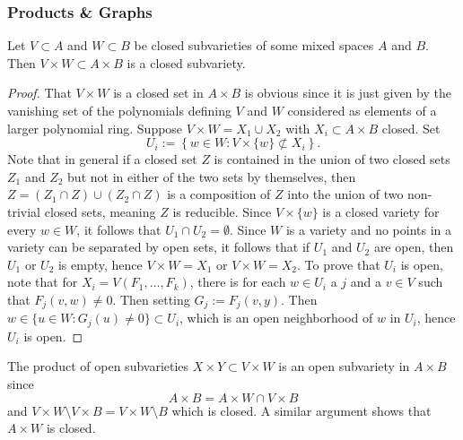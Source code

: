     \subsubsection{Products \& Graphs}
        \begin{proposition}
            Let $V\subset A$ and $W\subset B$ be closed subvarieties of some mixed spaces $A$ and $B$. Then $V\times W\subset A\times B$ is a closed subvariety. 
        \end{proposition}
        \begin{proof}
            That $V\times W$ is a closed set in $A\times B$ is obvious since it is just given by the vanishing set of the polynomials defining $V$ and $W$ considered as elements of a larger polynomial ring. Suppose $V\times W=X_1\cup X_2$ with $X_i\subset A\times B$ closed. Set 
            $$U_i := \left\{ w\in W: V\times \{w\}\not\subset X_i \right\}.$$
            Note that in general if a closed set $Z$ is contained in the union of two closed sets $Z_1$ and $Z_2$ but not in either of the two sets by themselves, then $Z = (Z_1\cap Z) \cup (Z_2\cap Z)$ is a composition of $Z$ into the union of two non-trivial closed sets, meaning $Z$ is reducible. Since $V\times \{w\}$ is a closed variety for every $w\in W$, it follows that $U_1\cap U_2 = \emptyset$. Since $W$ is a variety and no points in a variety can be separated by open sets, it follows that if $U_1$ and $U_2$ are open, then $U_1$ or $U_2$ is empty, hence $V\times W =X_1$ or $V\times W = X_2$. To prove that $U_i$ is open, note that for $X_i = V(F_1,\dots,F_k)$, there is for each $w\in U_i$ a $j$ and a $v\in V$ such that $F_j(v,w)\neq 0$. Then setting $G_j:= F_j(v,y)$. Then $w\in \{ u\in W: G_j(u)\neq 0\}\subset U_i$, which is an open neighborhood of $w$ in $U_i$, hence $U_i$ is open.  
        \end{proof}
        \begin{remark}
            The product of open subvarieties $X\times Y \subset V\times W$ is an open subvariety in $A\times B$ since 
            $$A\times B = A\times W \cap V\times B$$
            and $V\times W\setminus V\times B = V\times W\setminus B$ which is closed. A similar argument shows that $A\times W$ is closed.
        \end{remark}
